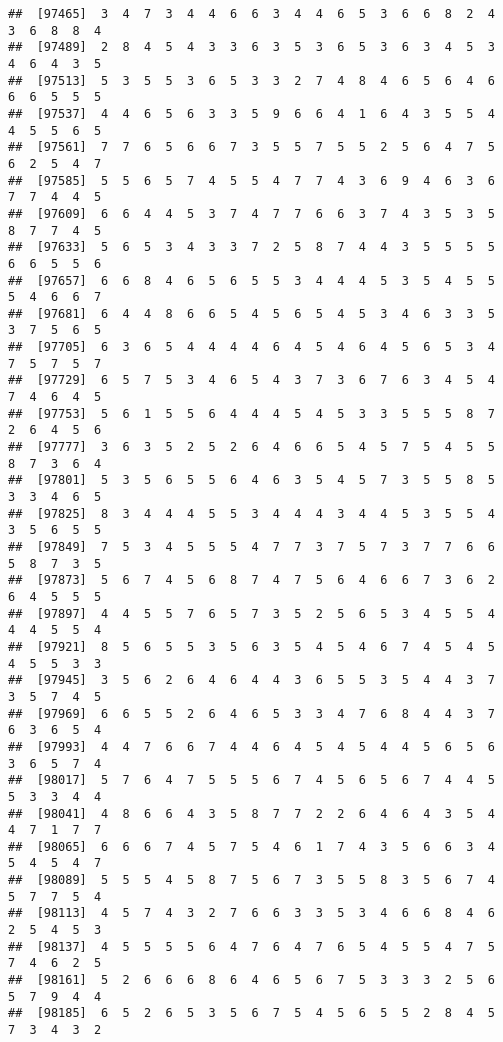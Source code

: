 \documentclass[
]{book}
\begin{document}
\begin{verbatim}
##  [97465]  3  4  7  3  4  4  6  6  3  4  4  6  5  3  6  6  8  2  4  3  6  8  8  4
##  [97489]  2  8  4  5  4  3  3  6  3  5  3  6  5  3  6  3  4  5  3  4  6  4  3  5
##  [97513]  5  3  5  5  3  6  5  3  3  2  7  4  8  4  6  5  6  4  6  6  6  5  5  5
##  [97537]  4  4  6  5  6  3  3  5  9  6  6  4  1  6  4  3  5  5  4  4  5  5  6  5
##  [97561]  7  7  6  5  6  6  7  3  5  5  7  5  5  2  5  6  4  7  5  6  2  5  4  7
##  [97585]  5  5  6  5  7  4  5  5  4  7  7  4  3  6  9  4  6  3  6  7  7  4  4  5
##  [97609]  6  6  4  4  5  3  7  4  7  7  6  6  3  7  4  3  5  3  5  8  7  7  4  5
##  [97633]  5  6  5  3  4  3  3  7  2  5  8  7  4  4  3  5  5  5  5  6  6  5  5  6
##  [97657]  6  6  8  4  6  5  6  5  5  3  4  4  4  5  3  5  4  5  5  5  4  6  6  7
##  [97681]  6  4  4  8  6  6  5  4  5  6  5  4  5  3  4  6  3  3  5  3  7  5  6  5
##  [97705]  6  3  6  5  4  4  4  4  6  4  5  4  6  4  5  6  5  3  4  7  5  7  5  7
##  [97729]  6  5  7  5  3  4  6  5  4  3  7  3  6  7  6  3  4  5  4  7  4  6  4  5
##  [97753]  5  6  1  5  5  6  4  4  4  5  4  5  3  3  5  5  5  8  7  2  6  4  5  6
##  [97777]  3  6  3  5  2  5  2  6  4  6  6  5  4  5  7  5  4  5  5  8  7  3  6  4
##  [97801]  5  3  5  6  5  5  6  4  6  3  5  4  5  7  3  5  5  8  5  3  3  4  6  5
##  [97825]  8  3  4  4  4  5  5  3  4  4  4  3  4  4  5  3  5  5  4  3  5  6  5  5
##  [97849]  7  5  3  4  5  5  5  4  7  7  3  7  5  7  3  7  7  6  6  5  8  7  3  5
##  [97873]  5  6  7  4  5  6  8  7  4  7  5  6  4  6  6  7  3  6  2  6  4  5  5  5
##  [97897]  4  4  5  5  7  6  5  7  3  5  2  5  6  5  3  4  5  5  4  4  4  5  5  4
##  [97921]  8  5  6  5  5  3  5  6  3  5  4  5  4  6  7  4  5  4  5  4  5  5  3  3
##  [97945]  3  5  6  2  6  4  6  4  4  3  6  5  5  3  5  4  4  3  7  3  5  7  4  5
##  [97969]  6  6  5  5  2  6  4  6  5  3  3  4  7  6  8  4  4  3  7  6  3  6  5  4
##  [97993]  4  4  7  6  6  7  4  4  6  4  5  4  5  4  4  5  6  5  6  3  6  5  7  4
##  [98017]  5  7  6  4  7  5  5  5  6  7  4  5  6  5  6  7  4  4  5  5  3  3  4  4
##  [98041]  4  8  6  6  4  3  5  8  7  7  2  2  6  4  6  4  3  5  4  4  7  1  7  7
##  [98065]  6  6  6  7  4  5  7  5  4  6  1  7  4  3  5  6  6  3  4  5  4  5  4  7
##  [98089]  5  5  5  4  5  8  7  5  6  7  3  5  5  8  3  5  6  7  4  5  7  7  5  4
##  [98113]  4  5  7  4  3  2  7  6  6  3  3  5  3  4  6  6  8  4  6  2  5  4  5  3
##  [98137]  4  5  5  5  5  6  4  7  6  4  7  6  5  4  5  5  4  7  5  7  4  6  2  5
##  [98161]  5  2  6  6  6  8  6  4  6  5  6  7  5  3  3  3  2  5  6  5  7  9  4  4
##  [98185]  6  5  2  6  5  3  5  6  7  5  4  5  6  5  5  2  8  4  5  7  3  4  3  2

\end{verbatim}
\end{document}
